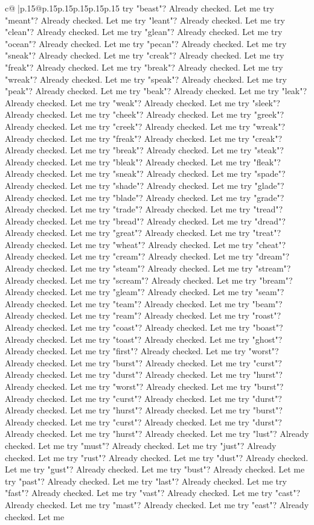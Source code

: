 \documentclass{article}
\begin{document}
{\begin{supertabular}{c@{$\;$}|p{.15\linewidth}@{}p{.15\linewidth}p{.15\linewidth}p{.15\linewidth}p{.15\linewidth}p{.15\linewidth}}
{{{try "beast"? Already checked. Let me try "meant"? Already checked. Let me try "leant"? Already checked. Let me try "clean"? Already checked. Let me try "glean"? Already checked. Let me try "ocean"? Already checked. Let me try "pecan"? Already checked. Let me try "sneak"? Already checked. Let me try "creak"? Already checked. Let me try "freak"? Already checked. Let me try "break"? Already checked. Let me try "wreak"? Already checked. Let me try "speak"? Already checked. Let me try "peak"? Already checked. Let me try "beak"? Already checked. Let me try "leak"? Already checked. Let me try "weak"? Already checked. Let me try "sleek"? Already checked. Let me try "cheek"? Already checked. Let me try "greek"? Already checked. Let me try "creek"? Already checked. Let me try "wreak"? Already checked. Let me try "freak"? Already checked. Let me try "creak"? Already checked. Let me try "break"? Already checked. Let me try "steak"? Already checked. Let me try "bleak"? Already checked. Let me try "fleak"? Already checked. Let me try "sneak"? Already checked. Let me try "spade"? Already checked. Let me try "shade"? Already checked. Let me try "glade"? Already checked. Let me try "blade"? Already checked. Let me try "grade"? Already checked. Let me try "trade"? Already checked. Let me try "tread"? Already checked. Let me try "bread"? Already checked. Let me try "dread"? Already checked. Let me try "great"? Already checked. Let me try "treat"? Already checked. Let me try "wheat"? Already checked. Let me try "cheat"? Already checked. Let me try "cream"? Already checked. Let me try "dream"? Already checked. Let me try "steam"? Already checked. Let me try "stream"? Already checked. Let me try "scream"? Already checked. Let me try "bream"? Already checked. Let me try "gleam"? Already checked. Let me try "seam"? Already checked. Let me try "team"? Already checked. Let me try "beam"? Already checked. Let me try "ream"? Already checked. Let me try "roast"? Already checked. Let me try "coast"? Already checked. Let me try "boast"? Already checked. Let me try "toast"? Already checked. Let me try "ghost"? Already checked. Let me try "first"? Already checked. Let me try "worst"? Already checked. Let me try "burst"? Already checked. Let me try "curst"? Already checked. Let me try "durst"? Already checked. Let me try "hurst"? Already checked. Let me try "worst"? Already checked. Let me try "burst"? Already checked. Let me try "curst"? Already checked. Let me try "durst"? Already checked. Let me try "hurst"? Already checked. Let me try "burst"? Already checked. Let me try "curst"? Already checked. Let me try "durst"? Already checked. Let me try "hurst"? Already checked. Let me try "lust"? Already checked. Let me try "must"? Already checked. Let me try "just"? Already checked. Let me try "rust"? Already checked. Let me try "dust"? Already checked. Let me try "gust"? Already checked. Let me try "bust"? Already checked. Let me try "past"? Already checked. Let me try "last"? Already checked. Let me try "fast"? Already checked. Let me try "vast"? Already checked. Let me try "cast"? Already checked. Let me try "mast"? Already checked. Let me try "east"? Already checked. Let me }}}
\end{supertabular}}
\end{document}
